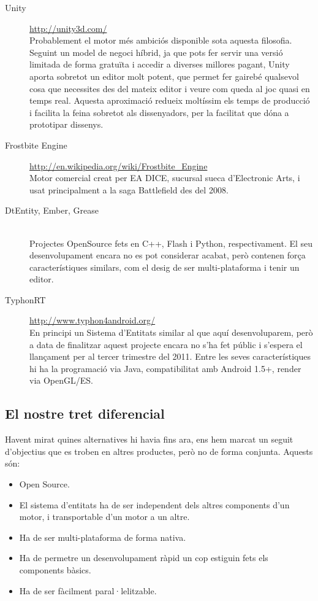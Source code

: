 \begin{description}
  \item[Unity] \url{http://unity3d.com/} \hfill \\
    Probablement el motor més ambiciós disponible sota aquesta filosofia. Seguint un model de negoci híbrid, ja que pots fer servir una versió limitada de forma gratuïta i accedir a diverses millores pagant, Unity aporta sobretot un editor molt potent, que permet fer gairebé qualsevol cosa que necessites des del mateix editor i veure com queda al joc quasi en temps real. Aquesta aproximació redueix moltíssim els temps de producció i facilita la feina sobretot als dissenyadors, per la facilitat que dóna a prototipar dissenys.
    
  \item[Frostbite Engine] \url{http://en.wikipedia.org/wiki/Frostbite_Engine} \hfill \\
    Motor comercial creat per EA DICE, sucursal sueca d'Electronic Arts, i usat principalment a la saga Battlefield des del 2008.
    
  \item[DtEntity, Ember, Grease] \citep{EntityWiki} \hfill \\
    Projectes OpenSource fets en C++, Flash i Python, respectivament. El seu desenvolupament encara no es pot considerar acabat, però contenen força característiques similars, com el desig de ser multi-plataforma i tenir un editor.
    
  \item[TyphonRT] \url{http://www.typhon4android.org/} \hfill \\
    En principi un Sistema d'Entitats similar al que aquí desenvoluparem, però a data de finalitzar aquest projecte encara no s'ha fet públic i s'espera el llançament per al tercer trimestre del 2011. Entre les seves característiques hi ha la programació via Java, compatibilitat amb Android 1.5+, render via OpenGL/ES.
  
\end{description}

\subsection{El nostre tret diferencial}

Havent mirat quines alternatives hi havia fins ara, ens hem marcat un seguit d'objectius que es troben en altres productes, però no de forma conjunta. Aquests són:

\begin{itemize}
  \item Open Source.
  \item El sistema d'entitats ha de ser independent dels altres components d'un motor, i transportable d'un motor a un altre.
  \item Ha de ser multi-plataforma de forma nativa.
  \item Ha de permetre un desenvolupament ràpid un cop estiguin fets els components bàsics.
  \item Ha de ser fàcilment paral·lelitzable.
\end{itemize}

